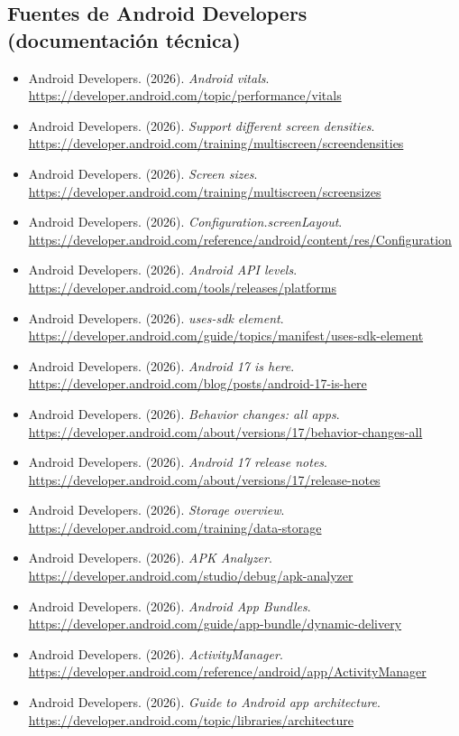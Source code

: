 \documentclass[11pt,a4paper]{article}
\begin{document}
	\subsection*{Fuentes de Android Developers (documentación técnica)}
	{\small
		\begin{itemize}[leftmargin=*,itemsep=0.1em,label={}]
			\item Android Developers. (2026). \emph{Android vitals}. \url{https://developer.android.com/topic/performance/vitals}
			\item Android Developers. (2026). \emph{Support different screen densities}. \url{https://developer.android.com/training/multiscreen/screendensities}
			\item Android Developers. (2026). \emph{Screen sizes}. \url{https://developer.android.com/training/multiscreen/screensizes}
			\item Android Developers. (2026). \emph{Configuration.screenLayout}. \url{https://developer.android.com/reference/android/content/res/Configuration}
			\item Android Developers. (2026). \emph{Android API levels}. \url{https://developer.android.com/tools/releases/platforms}
			\item Android Developers. (2026). \emph{uses-sdk element}. \url{https://developer.android.com/guide/topics/manifest/uses-sdk-element}
			\item Android Developers. (2026). \emph{Android 17 is here}. \url{https://developer.android.com/blog/posts/android-17-is-here}
			\item Android Developers. (2026). \emph{Behavior changes: all apps}. \url{https://developer.android.com/about/versions/17/behavior-changes-all}
			\item Android Developers. (2026). \emph{Android 17 release notes}. \url{https://developer.android.com/about/versions/17/release-notes}
			\item Android Developers. (2026). \emph{Storage overview}. \url{https://developer.android.com/training/data-storage}
			\item Android Developers. (2026). \emph{APK Analyzer}. \url{https://developer.android.com/studio/debug/apk-analyzer}
			\item Android Developers. (2026). \emph{Android App Bundles}. \url{https://developer.android.com/guide/app-bundle/dynamic-delivery}
			\item Android Developers. (2026). \emph{ActivityManager}. \url{https://developer.android.com/reference/android/app/ActivityManager}
			\item Android Developers. (2026). \emph{Guide to Android app architecture}. \url{https://developer.android.com/topic/libraries/architecture}

\end{itemize}}
\end{document}
